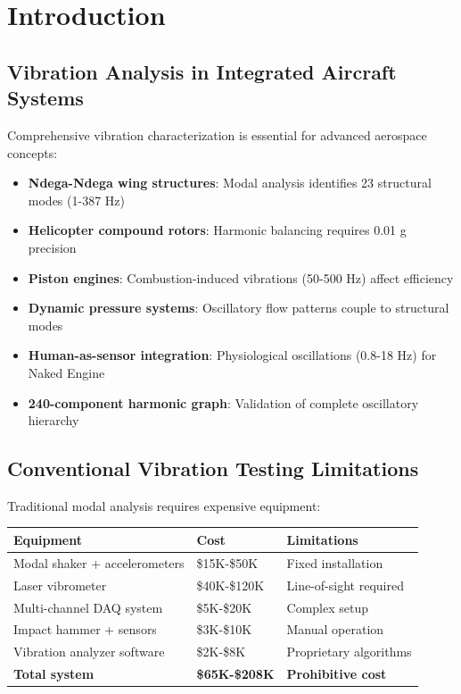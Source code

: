 \documentclass[12pt,a4paper]{article}
\begin{document}
\section{Introduction}

\subsection{Vibration Analysis in Integrated Aircraft Systems}

Comprehensive vibration characterization is essential for advanced aerospace concepts:

\begin{itemize}
\item \textbf{Ndega-Ndega wing structures}: Modal analysis identifies 23 structural modes (1-387 Hz)
\item \textbf{Helicopter compound rotors}: Harmonic balancing requires 0.01 g precision
\item \textbf{Piston engines}: Combustion-induced vibrations (50-500 Hz) affect efficiency
\item \textbf{Dynamic pressure systems}: Oscillatory flow patterns couple to structural modes
\item \textbf{Human-as-sensor integration}: Physiological oscillations (0.8-18 Hz) for Naked Engine
\item \textbf{240-component harmonic graph}: Validation of complete oscillatory hierarchy
\end{itemize}

\subsection{Conventional Vibration Testing Limitations}

Traditional modal analysis requires expensive equipment:

\begin{center}
\begin{tabular}{|l|l|l|}
\hline
\textbf{Equipment} & \textbf{Cost} & \textbf{Limitations} \\
\hline
Modal shaker + accelerometers & \$15K-\$50K & Fixed installation \\
Laser vibrometer & \$40K-\$120K & Line-of-sight required \\
Multi-channel DAQ system & \$5K-\$20K & Complex setup \\
Impact hammer + sensors & \$3K-\$10K & Manual operation \\
Vibration analyzer software & \$2K-\$8K & Proprietary algorithms \\
\hline
\textbf{Total system} & \textbf{\$65K-\$208K} & \textbf{Prohibitive cost} \\
\hline
\end{tabular}
\end{center}
\end{document}
